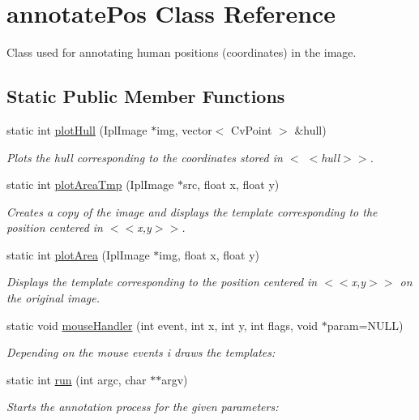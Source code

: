 \hypertarget{classannotatePos}{
\section{annotatePos Class Reference}
\label{classannotatePos}
}


Class used for annotating human positions (coordinates) in the image.  


\subsection*{Static Public Member Functions}
\begin{DoxyCompactItemize}
\item 
static int \hyperlink{classannotatePos_a757c468a7855d93ea5e6a46d47946f3f}{plotHull} (IplImage $\ast$img, vector$<$ CvPoint $>$ \&hull)
\begin{DoxyCompactList}\small\item\em Plots the hull corresponding to the coordinates stored in {\ttfamily $<$} $<$hull$>$$>$. \item\end{DoxyCompactList}\item 
static int \hyperlink{classannotatePos_a6f8b36ef04b50aaae7e468a3ed724edb}{plotAreaTmp} (IplImage $\ast$src, float x, float y)
\begin{DoxyCompactList}\small\item\em Creates a copy of the image and displays the template corresponding to the position centered in {\ttfamily $<$$<$x},y$>$$>$. \item\end{DoxyCompactList}\item 
static int \hyperlink{classannotatePos_ae0b48052905964bfb1250608ae7a291a}{plotArea} (IplImage $\ast$img, float x, float y)
\begin{DoxyCompactList}\small\item\em Displays the template corresponding to the position centered in {\ttfamily $<$$<$x},y$>$$>$ on the original image. \item\end{DoxyCompactList}\item 
static void \hyperlink{classannotatePos_afc6511c0a55bda3f04cf297c3736db28}{mouseHandler} (int event, int x, int y, int flags, void $\ast$param=NULL)
\begin{DoxyCompactList}\small\item\em Depending on the mouse events i draws the templates: \item\end{DoxyCompactList}\item 
static int \hyperlink{classannotatePos_a3dddef844f78f877a6da0208b11a7417}{run} (int argc, char $\ast$$\ast$argv)
\begin{DoxyCompactList}\small\item\em Starts the annotation process for the given parameters: \item\end{DoxyCompactList}\end{DoxyCompactItemize}

